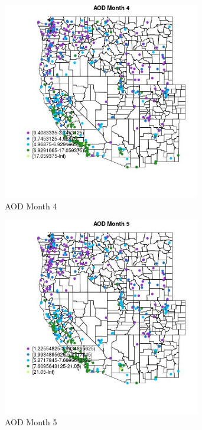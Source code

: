 \clearpage 

\begin{figure} 
\centering  
\includegraphics[width=0.77\textwidth]{Code_Outputs/ML_input_report_ML_input_PM25_Step5_part_d_de_duplicated_aves_ML_input_MapObsMo4AOD.jpg} 
\caption{\label{fig:ML_input_report_ML_input_PM25_Step5_part_d_de_duplicated_aves_ML_inputMapObsMo4AOD}AOD Month 4} 
\end{figure} 
 

\begin{figure} 
\centering  
\includegraphics[width=0.77\textwidth]{Code_Outputs/ML_input_report_ML_input_PM25_Step5_part_d_de_duplicated_aves_ML_input_MapObsMo5AOD.jpg} 
\caption{\label{fig:ML_input_report_ML_input_PM25_Step5_part_d_de_duplicated_aves_ML_inputMapObsMo5AOD}AOD Month 5} 
\end{figure} 
 

